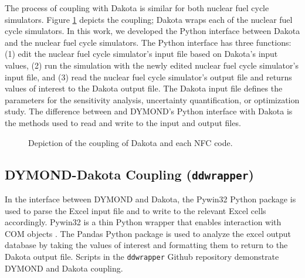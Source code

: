 The process of coupling with Dakota is similar 
for both nuclear fuel cycle simulators. 
Figure \ref{fig:dakota-NFC-flow} depicts the coupling; 
Dakota wraps each of the nuclear fuel cycle simulators.
In this work, we developed the Python interface between 
Dakota and the nuclear fuel cycle simulators.
The Python interface has three functions: 
(1) edit the nuclear fuel cycle simulator's input file based on Dakota's input values, 
(2) run the simulation with the newly edited nuclear fuel cycle simulator's input file, and 
(3) read the nuclear fuel cycle simulator's output file and returns values of interest 
to the Dakota output file. 
The Dakota input file defines the parameters for the sensitivity analysis, 
uncertainty quantification, or optimization study.
The difference between \Cyclus and DYMOND's Python interface with Dakota is the
methods used to read and write to the input and output files. 

\begin{figure}[]
    \centering
    \caption{Depiction of the coupling of Dakota and each NFC code.}
    \label{fig:dakota-NFC-flow}
\end{figure}

\subsection{DYMOND-Dakota Coupling (\texttt{ddwrapper})}
In the interface between DYMOND and Dakota, the Pywin32 
\cite{hammond_python_2000}
Python package is used to parse the Excel input file and to 
write to the relevant Excel cells accordingly. 
Pywin32 is a thin Python wrapper that enables interaction 
with COM objects \cite{hammond_python_2000}. 
The Pandas \cite{mckinney_pandas:_2011} Python
package is used to analyze the excel output database 
by taking the values of interest and formatting them 
to return to the Dakota output file.
Scripts in the \texttt{ddwrapper} Github repository \cite{chee_gwenchee/ddwrapper_2019}
demonstrate DYMOND and Dakota coupling. 

